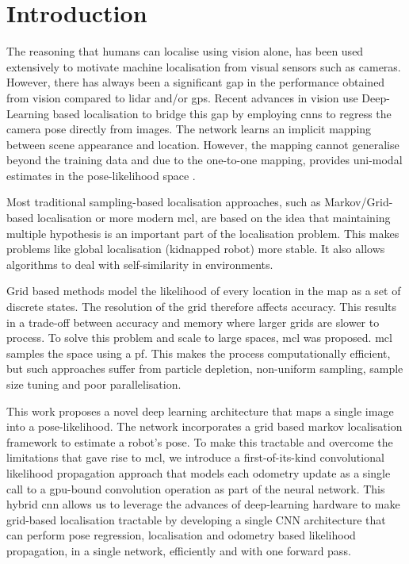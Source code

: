 \documentclass[letterpaper, 10 pt, conference]{ieeeconf}  %
\begin{document}
\section{Introduction}

The reasoning that humans can localise using vision alone, has been used extensively to motivate machine localisation from visual sensors such as cameras.
However, there has always been a significant gap in the performance obtained from vision compared to \ac{lidar} and/or \ac{gps}.
Recent advances in vision use Deep-Learning based localisation \cite{Kendall2015Posenet,Mendez18} to bridge this gap by
employing \acp{cnn} to regress the camera pose directly from images.
The network learns an implicit mapping between scene appearance and location. 
However, the mapping cannot generalise beyond the training data and due to the one-to-one mapping, provides uni-modal estimates in the pose-likelihood space \cite{kendall2016modelling}.

Most traditional sampling-based localisation approaches, such as Markov/Grid-based localisation or more modern \ac{mcl}, are based on the idea that maintaining multiple hypothesis is an important part of the localisation problem.
This makes problems like global localisation (kidnapped robot) more stable.
It also allows algorithms to deal with self-similarity in environments.

Grid based methods model the likelihood of every location in the map as a set of discrete states. The resolution of the grid therefore affects accuracy. This results in a trade-off between accuracy and memory where larger grids are slower to process. To solve this problem and scale to large spaces, \ac{mcl} was proposed. \ac{mcl} samples the space using a \ac{pf}.
This makes the process computationally efficient, but such approaches suffer from particle depletion, non-uniform sampling, sample size tuning and poor parallelisation.

This work proposes a novel deep learning architecture that maps a single image into a pose-likelihood.
The network incorporates a grid based markov localisation framework to estimate a robot's pose.
To make this tractable and overcome the limitations that gave rise to \ac{mcl}, we introduce a first-of-its-kind convolutional likelihood propagation approach that models each odometry update as a single call to a gpu-bound convolution operation as part of the neural network.
This hybrid \ac{cnn} allows us to leverage the advances of deep-learning hardware to make grid-based localisation tractable by developing a single CNN architecture that can perform pose regression, localisation and odometry based likelihood propagation, in a single network, efficiently and with one forward pass.
\vspace{-0.25cm}
\end{document}
